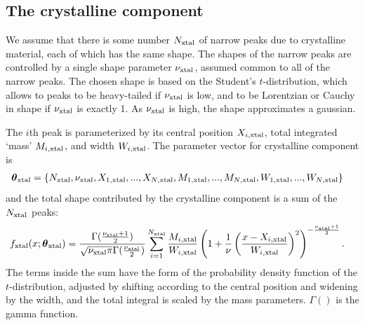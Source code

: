 \documentclass[review]{elsarticle}
\newcommand{\params}{\boldsymbol{\theta}}
\newcommand{\x}{x}
\begin{document}
\subsection{The crystalline component}



We assume that there is some number $N_{\rm xtal}$ of narrow peaks
due to crystalline material,
each of which has the same shape. The shapes of the narrow
peaks are controlled by a single shape parameter $\nu_{\rm xtal}$,
assumed common to all of the narrow peaks. The chosen shape is based
on the Student's $t$-distribution, which allows to peaks to be heavy-tailed
if $\nu_{\rm xtal}$ is low, and to be Lorentzian or Cauchy in shape if
$\nu_{\rm xtal}$ is exactly 1. As $\nu_{\rm xtal}$ is high, the shape
approximates a gaussian.

The $i$th peak is parameterized
by its central position $X_{i, \rm xtal}$,
total integrated `mass' $M_{i, \rm xtal}$, and width $W_{i, \rm xtal}$.
The parameter vector for crystalline component is
\begin{align}
\params_{\rm xtal} &=
  \{N_{\rm xtal}, \nu_{\rm xtal}, X_{1, \rm xtal}, ..., X_{N, \rm xtal},
    M_{1, \rm xtal}, ..., M_{N, \rm xtal},
    W_{1, \rm xtal}, ..., W_{N, \rm xtal}\}
\end{align}
and the total shape contributed by the
crystalline component is a sum of the $N_{\rm xtal}$ peaks:
\begin{align}
f_{\rm xtal}(\x; \params_{\rm xtal}) &=
	\frac{\Gamma(\frac{\nu_{\rm xtal} + 1}{2})}{\sqrt{\nu_{\rm xtal}\pi}
                 		\Gamma(\frac{\nu_{\rm xtal}}{2})}
    \sum_{i=1}^{N_{\rm xtal}}
    		\frac{M_{i, \rm xtal}}
            	 {W_{i, \rm xtal}}
	\left(1 + \frac{1}{\nu}\left(\frac{x - X_{i, \rm xtal}}{W_{i, \rm xtal}}\right)^2\right)
    			^{-\frac{\nu_{\rm xtal} + 1}{2}}. \label{eqn:t_shape}
\end{align}
The terms inside the sum have the form of the probability density function
of the $t$-distribution, adjusted by shifting according to the central
position and widening by the width, and the total integral is scaled by
the mass parameters. $\Gamma()$ is the gamma function.
\end{document}
